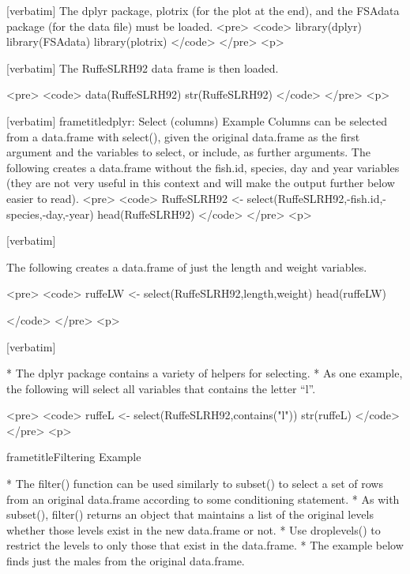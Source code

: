 [verbatim]
The dplyr package, plotrix (for the plot at the end), and the FSAdata package (for the data file) must be loaded.
<pre>
<code>
library(dplyr)
library(FSAdata)
library(plotrix)
</code>
</pre>
<p>


[verbatim]
The RuffeSLRH92 data frame is then loaded.

<pre>
<code>
data(RuffeSLRH92)
str(RuffeSLRH92)
</code>
</pre>
<p>


[verbatim]
frametitle{dplyr: Select (columns) Example}
Columns can be selected from a data.frame with select(), given the original data.frame as the first argument and the variables to select, or include, as further arguments. The following creates a data.frame without the fish.id, species, day and year variables (they are not very useful in this context and will make the output further below easier to read).
<pre>
<code>
RuffeSLRH92 <- select(RuffeSLRH92,-fish.id,-species,-day,-year)
head(RuffeSLRH92)
</code>
</pre>
<p>


[verbatim]

The following creates a data.frame of just the length and weight variables.

<pre>
<code>
ruffeLW <- select(RuffeSLRH92,length,weight)
head(ruffeLW)

</code>
</pre>
<p>


[verbatim]

         * 
The dplyr package contains a variety of helpers for selecting. 
         * As one example, the following will select all variables that contains the letter “l”.

<pre>
<code>
ruffeL <- select(RuffeSLRH92,contains("l"))
str(ruffeL)
</code>
</pre>
<p>



frametitle{Filtering Example}

         * The filter() function can be used similarly to subset() to select a set of rows from an original data.frame according to some 
conditioning statement. 
         * As with subset(), filter() returns an object that maintains a list of the original levels whether those levels exist in the new data.frame or not.
          * Use droplevels() to restrict the levels to only those that exist in the data.frame. 
         * The example below finds just the males from the original data.frame.

